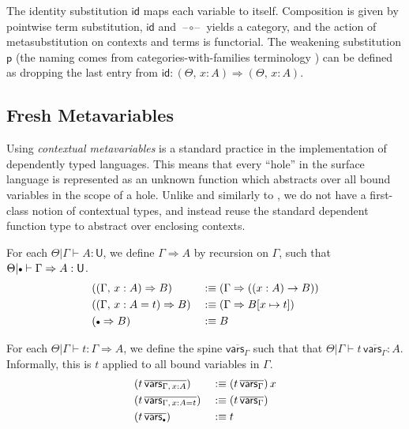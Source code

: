 \documentclass[acmsmall,review,anonymous,prologue,dvipsnames]{acmart}\settopmatter{printfolios=true,printccs=false,printacmref=false}
\renewcommand{\U}{\mathsf{U}}
\newcommand{\emptycon}{\scaleobj{.75}\bullet}
\newcommand{\To}{\Rightarrow}
\newcommand{\p}{\mathsf{p}}
\newcommand{\id}{\mathsf{id}}
\newcommand{\blank}{\mathord{\hspace{1pt}\text{--}\hspace{1pt}}}
\theoremstyle{remark}
\begin{document}

The identity substitution $\id$ maps each variable to itself. Composition is
given by pointwise term substitution, $\id$ and $\blank\circ\blank$ yields a
category, and the action of metasubstitution on contexts and terms is
functorial. The weakening substitution $\p$ (the naming comes from
categories-with-families terminology \cite{dybjer1995internal}) can be defined
as dropping the last entry from $\id : (\Theta,\,x : A) \To (\Theta,\,x : A)$.

\subsection{Fresh Metavariables}

Using \emph{contextual metavariables} is a standard practice in the
implementation of dependently typed languages. This means that every ``hole'' in
the surface language is represented as an unknown function which abstracts over
all bound variables in the scope of a hole. Unlike \cite{nanevski2008contextual}
and similarly to \cite{gundry2013type}, we do not have a first-class notion of
contextual types, and instead reuse the standard dependent function type to
abstract over enclosing contexts.

\begin{definition}\label{def:closingtype} For each $\Theta|\Gamma \vdash A : \U$, we define
$\Gamma \To A$ by recursion on $\Gamma$, such that $\Theta|\emptycon\vdash
  \Gamma \To A : \U$.
  \begin{alignat*}{3}
    &((\Gamma,\, x : A) \To B)     && :\equiv (\Gamma \To ((x : A) \to B))\\
    &((\Gamma,\, x : A = t) \To B) && :\equiv (\Gamma \To B[x\mapsto t])\\
    &(\emptycon \To B)             && :\equiv B
  \end{alignat*}
\end{definition}

\begin{definition}[Contextualization]\label{def:contextualization} For each $\Theta|\Gamma \vdash t : \Gamma\To A$,
we define the spine $\overline{\mathsf{vars}_{\Gamma}}$ such that that
$\Theta|\Gamma\vdash t\,\overline{\mathsf{vars}_{\Gamma}} : A$. Informally, this
is $t$ applied to all bound variables in $\Gamma$.
  \begin{alignat*}{3}
    &(t\,\overline{\mathsf{vars}_{\Gamma,\,x:A}})   && :\equiv (t\,\overline{\mathsf{vars}_{\Gamma}})\,x \\
    &(t\,\overline{\mathsf{vars}_{\Gamma,\,x:A=t}}) && :\equiv (t\,\overline{\mathsf{vars}_{\Gamma}}) \\
    &(t\,\overline{\mathsf{vars}_{\emptycon}})     && :\equiv t
  \end{alignat*}
\end{definition}
\end{document}
